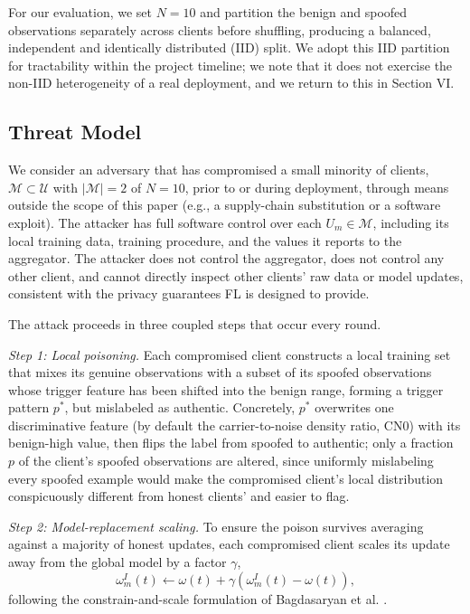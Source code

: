 \documentclass[journal]{IEEEtran}
\begin{document}
For our evaluation, we set $N=10$ and partition the benign and spoofed observations separately across clients before shuffling, producing a balanced, independent and identically distributed (IID) split. We adopt this IID partition for tractability within the project timeline; we note that it does not exercise the non-IID heterogeneity of a real deployment, and we return to this in Section VI.

\subsection{Threat Model}
\label{subsec:threat}
We consider an adversary that has compromised a small minority of clients, $\mathcal{M} \subset \mathcal{U}$ with $|\mathcal{M}| = 2$ of $N = 10$, prior to or during deployment, through means outside the scope of this paper (e.g., a supply-chain substitution or a software exploit). The attacker has full software control over each $U_m \in \mathcal{M}$, including its local training data, training procedure, and the values it reports to the aggregator. The attacker does not control the aggregator, does not control any other client, and cannot directly inspect other clients' raw data or model updates, consistent with the privacy guarantees FL is designed to provide.

The attack proceeds in three coupled steps that occur every round.

\textit{Step 1: Local poisoning.} Each compromised client constructs a local training set that mixes its genuine observations with a subset of its spoofed observations whose trigger feature has been shifted into the benign range, forming a trigger pattern $p^{*}$, but mislabeled as authentic. Concretely, $p^{*}$ overwrites one discriminative feature (by default the carrier-to-noise density ratio, CN0) with its benign-high value, then flips the label from spoofed to authentic; only a fraction $p$ of the client's spoofed observations are altered, since uniformly mislabeling every spoofed example would make the compromised client's local distribution conspicuously different from honest clients' and easier to flag.

\textit{Step 2: Model-replacement scaling.} To ensure the poison survives averaging against a majority of honest updates, each compromised client scales its update away from the global model by a factor $\gamma$,
\begin{equation}
\omega_m^{I}(t) \leftarrow \omega(t) + \gamma\left(\omega_m^{I}(t) - \omega(t)\right),
\label{eq:boost}
\end{equation}
following the constrain-and-scale formulation of Bagdasaryan et al. \cite{bagdasaryan2020backdoor}.
\end{document}
